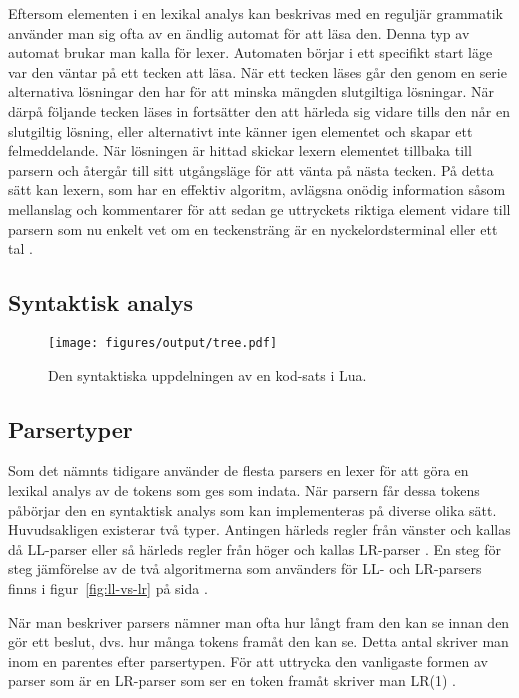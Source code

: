 Eftersom elementen i en lexikal analys kan beskrivas med en reguljär grammatik
använder man sig ofta av en ändlig automat för att läsa den. Denna typ av
automat brukar man kalla för lexer. Automaten börjar i ett specifikt start
läge var den väntar på ett tecken att läsa. När ett tecken läses går den genom
en serie alternativa lösningar den har för att minska mängden slutgiltiga
lösningar. När därpå följande tecken läses in fortsätter den att härleda sig
vidare tills den når en slutgiltig lösning, eller alternativt inte känner igen
elementet och skapar ett felmeddelande. När lösningen är hittad skickar lexern
elementet tillbaka till parsern och återgår till sitt utgångsläge för att
vänta på nästa tecken. På detta sätt kan lexern, som har en effektiv
algoritm, avlägsna onödig information såsom mellanslag och kommentarer för
att sedan ge uttryckets riktiga element vidare till parsern som nu enkelt vet
om en teckensträng är en nyckelordsterminal eller ett tal \citep[s.
51]{sm09}.

\subsection{Syntaktisk analys}

\begin{figure}[ht]
  \texttt{[image: figures/output/tree.pdf]}
  \caption{Den syntaktiska uppdelningen av en kod-sats i Lua.}
\end{figure}

\subsection{Parsertyper}

Som det nämnts tidigare använder de flesta parsers en lexer för att
göra en lexikal analys av de tokens som ges som indata. När parsern får dessa
tokens påbörjar den en syntaktisk analys som kan implementeras på diverse
olika sätt. Huvudsakligen existerar två typer. Antingen härleds regler från
vänster och kallas då LL-parser eller så härleds regler från höger och kallas
LR-parser \citep[s. 67]{sm09}. En steg för steg jämförelse av de två
algoritmerna som använders för LL- och LR-parsers finns i
figur~\ref{fig:ll-vs-lr} på sida \pageref{fig:ll-vs-lr}.

När man beskriver parsers nämner man ofta hur långt fram den kan se innan den
gör ett beslut, dvs. hur många tokens framåt den kan se. Detta antal skriver
man inom en parentes efter parsertypen. För att uttrycka den vanligaste
formen av parser som är en LR-parser som ser en token framåt skriver man
LR(1) \citep[s. 69]{sm09}.

